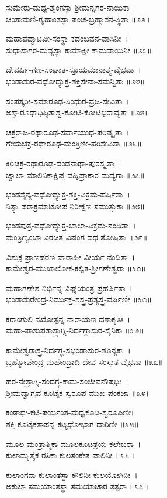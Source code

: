 ಸುಮೇರು-ಮಧ್ಯ-ಶೃಂಗಸ್ಥಾ ಶ್ರೀಮನ್ನಗರ-ನಾಯಿಕಾ~।\\
ಚಿಂತಾಮಣಿ-ಗೃಹಾಂತಸ್ಥಾ ಪಂಚ-ಬ್ರಹ್ಮಾಸನ-ಸ್ಥಿತಾ ॥೨೨॥

ಮಹಾಪದ್ಮಾಟವೀ-ಸಂಸ್ಥಾ ಕದಂಬವನ-ವಾಸಿನೀ~।\\
ಸುಧಾಸಾಗರ-ಮಧ್ಯಸ್ಥಾ ಕಾಮಾಕ್ಷೀ ಕಾಮದಾಯಿನೀ ॥೨೩॥

ದೇವರ್ಷಿ-ಗಣ-ಸಂಘಾತ-ಸ್ತೂಯಮಾನಾತ್ಮ-ವೈಭವಾ~।\\
ಭಂಡಾಸುರ-ವಧೋದ್ಯುಕ್ತ-ಶಕ್ತಿಸೇನಾ-ಸಮನ್ವಿತಾ ॥೨೪॥

ಸಂಪತ್ಕರೀ-ಸಮಾರೂಢ-ಸಿಂಧುರ-ವ್ರಜ-ಸೇವಿತಾ~।\\
ಅಶ್ವಾರೂಢಾಧಿಷ್ಠಿತಾಶ್ವ-ಕೋಟಿ-ಕೋಟಿಭಿರಾವೃತಾ ॥೨೫॥

ಚಕ್ರರಾಜ-ರಥಾರೂಢ-ಸರ್ವಾಯುಧ-ಪರಿಷ್ಕೃತಾ~।\\
ಗೇಯಚಕ್ರ-ರಥಾರೂಢ-ಮಂತ್ರಿಣೀ-ಪರಿಸೇವಿತಾ ॥೨೬॥

ಕಿರಿಚಕ್ರ-ರಥಾರೂಢ-ದಂಡನಾಥಾ-ಪುರಸ್ಕೃತಾ~।\\
ಜ್ವಾಲಾ-ಮಾಲಿನಿಕಾಕ್ಷಿಪ್ತ-ವಹ್ನಿಪ್ರಾಕಾರ-ಮಧ್ಯಗಾ ॥೨೭॥

ಭಂಡಸೈನ್ಯ-ವಧೋದ್ಯುಕ್ತ-ಶಕ್ತಿ-ವಿಕ್ರಮ-ಹರ್ಷಿತಾ~।\\
ನಿತ್ಯಾ-ಪರಾಕ್ರಮಾಟೋಪ-ನಿರೀಕ್ಷಣ-ಸಮುತ್ಸುಕಾ ॥೨೮॥

ಭಂಡಪುತ್ರ-ವಧೋದ್ಯುಕ್ತ-ಬಾಲಾ-ವಿಕ್ರಮ-ನಂದಿತಾ~।\\
ಮಂತ್ರಿಣ್ಯಂಬಾ-ವಿರಚಿತ-ವಿಷಂಗ-ವಧ-ತೋಷಿತಾ ॥೨೯॥

ವಿಶುಕ್ರ-ಪ್ರಾಣಹರಣ-ವಾರಾಹೀ-ವೀರ್ಯ-ನಂದಿತಾ~।\\
ಕಾಮೇಶ್ವರ-ಮುಖಾಲೋಕ-ಕಲ್ಪಿತ-ಶ್ರೀಗಣೇಶ್ವರಾ ॥೩೦॥

ಮಹಾಗಣೇಶ-ನಿರ್ಭಿನ್ನ-ವಿಘ್ನಯಂತ್ರ-ಪ್ರಹರ್ಷಿತಾ~।\\
ಭಂಡಾಸುರೇಂದ್ರ-ನಿರ್ಮುಕ್ತ-ಶಸ್ತ್ರ-ಪ್ರತ್ಯಸ್ತ್ರ-ವರ್ಷಿಣೀ ॥೩೧॥

ಕರಾಂಗುಲಿ-ನಖೋತ್ಪನ್ನ-ನಾರಾಯಣ-ದಶಾಕೃತಿಃ~।\\
ಮಹಾ-ಪಾಶುಪತಾಸ್ತ್ರಾಗ್ನಿ-ನಿರ್ದಗ್ಧಾಸುರ-ಸೈನಿಕಾ ॥೩೨॥

ಕಾಮೇಶ್ವರಾಸ್ತ್ರ-ನಿರ್ದಗ್ಧ-ಸಭಂಡಾಸುರ-ಶೂನ್ಯಕಾ~।\\
ಬ್ರಹ್ಮೋಪೇಂದ್ರ-ಮಹೇಂದ್ರಾದಿ-ದೇವ-ಸಂಸ್ತುತ-ವೈಭವಾ ॥೩೩॥

ಹರ-ನೇತ್ರಾಗ್ನಿ-ಸಂದಗ್ಧ-ಕಾಮ-ಸಂಜೀವನೌಷಧಿಃ~।\\
ಶ್ರೀಮದ್ವಾಗ್ಭವ-ಕೂಟೈಕ-ಸ್ವರೂಪ-ಮುಖ-ಪಂಕಜಾ ॥೩೪॥

ಕಂಠಾಧಃ-ಕಟಿ-ಪರ್ಯಂತ-ಮಧ್ಯಕೂಟ-ಸ್ವರೂಪಿಣೀ।\\
ಶಕ್ತಿ-ಕೂಟೈಕತಾಪನ್ನ-ಕಟ್ಯಧೋಭಾಗ ಧಾರಿಣೀ ॥೩೫॥

ಮೂಲ-ಮಂತ್ರಾತ್ಮಿಕಾ ಮೂಲಕೂಟತ್ರಯ-ಕಲೇಬರಾ~।\\
ಕುಲಾಮೃತೈಕ-ರಸಿಕಾ ಕುಲಸಂಕೇತ-ಪಾಲಿನೀ ॥೩೬॥

ಕುಲಾಂಗನಾ ಕುಲಾಂತಸ್ಥಾ ಕೌಲಿನೀ ಕುಲಯೋಗಿನೀ~।\\
ಅಕುಲಾ ಸಮಯಾಂತಸ್ಥಾ ಸಮಯಾಚಾರ-ತತ್ಪರಾ ॥೩೭॥

